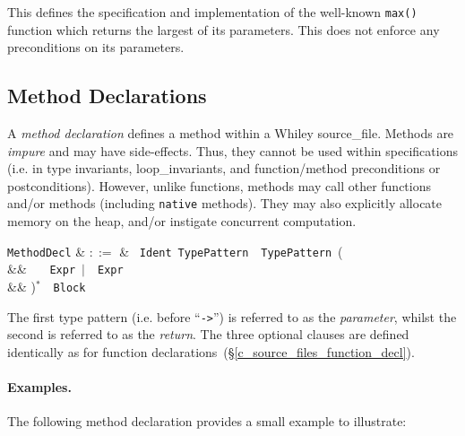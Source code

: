 This defines the specification and implementation of the well-known \lstinline{max()} function which returns the largest of its parameters. This does not enforce any preconditions on its parameters.


\subsection{Method Declarations}
\label{c_source_files_method_decl}

A {\em method declaration} defines a method within a Whiley \gls{source_file}.  Methods are {\em impure} and may have side-effects.  Thus, they cannot be used within specifications (i.e. in type invariants, \gls{loop_invariant}s, and function/method \gls{precondition}s or \gls{postcondition}s).  However, unlike functions, methods may call other functions and/or methods (including \lstinline{native} methods).  They may also explicitly allocate memory on the heap, and/or instigate concurrent computation.

\begin{syntax}
  \verb+MethodDecl+ & $::=$ & \ \verb+Ident+\
  \verb+TypePattern+\ \token{->}\ \verb+TypePattern+\ \big(\\
  && \ \ \ \verb+Expr+\ $|$\ \ \verb+Expr+\\
  && \big)$^*$\ \token{:}\ \verb+Block+\\
\end{syntax}

The first type pattern (i.e. before ``\lstinline{->}'') is referred to as the {\em parameter}, whilst the second is referred to as the {\em   return}.  The three optional clauses are defined identically as for function declarations~(\S\ref{c_source_files_function_decl}).

\paragraph{Examples.}  The following method declaration provides a
small example to illustrate:






